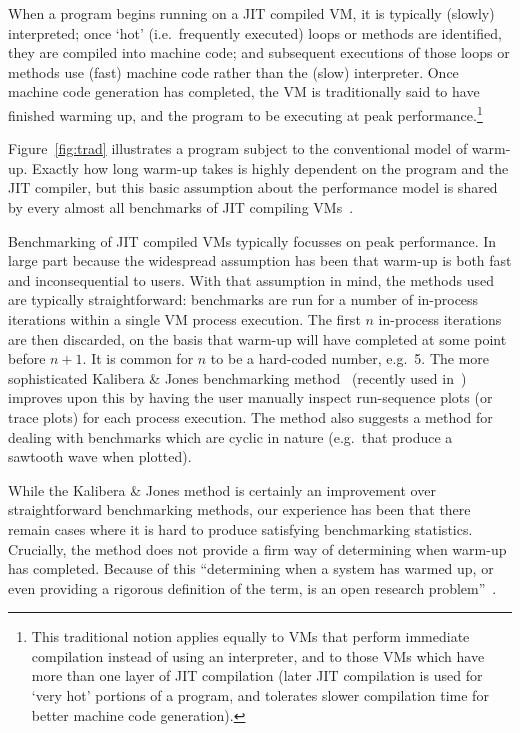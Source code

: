 \documentclass[preprint]{sigplanconf}
\newcommand{\kalibera}{Kalibera \& Jones\xspace}
\begin{document}
When a program begins running on a JIT compiled VM, it is typically (slowly)
interpreted; once `hot' (i.e.~frequently executed) loops or methods are
identified, they are compiled into machine code; and subsequent
executions of those loops or methods use (fast) machine code rather than the
(slow) interpreter. Once machine code generation has completed, the VM is
traditionally said to have finished warming up, and the program to be executing
at peak performance.\footnote{This traditional notion applies equally to VMs
that perform immediate compilation instead of using an interpreter, and to
those VMs which have more than one layer of JIT compilation (later JIT
compilation is used for `very hot' portions of a program, and tolerates slower
compilation time for better machine code generation).}

Figure~\ref{fig:trad} illustrates a
program subject to the conventional model of warm-up. Exactly how long warm-up
takes is highly dependent on
the program and the JIT compiler, but this basic assumption about the
performance model is shared by every almost all benchmarks of JIT compiling
VMs~\cite{kalibera13rigorous}.

Benchmarking of JIT compiled VMs typically focusses on peak
performance. In large part because the widespread assumption has been that
warm-up is both fast and inconsequential to users. With that assumption in mind, the
methods used are typically straightforward: benchmarks are run for a number
of in-process iterations within a single VM process execution.
The first $n$ in-process iterations are then discarded, on the basis that warm-up
will have completed at some point before $n+1$. It is common for
$n$ to be a hard-coded number, e.g.~5. The more sophisticated \kalibera
benchmarking method~\cite{kalibera12quantifying,kalibera13rigorous}
(recently used in~\cite{barrett15approaches,grimmer15dynamically}) improves
upon this by having the user manually inspect run-sequence plots (or trace
plots) for each process execution. The method also suggests a method for
dealing with benchmarks which are cyclic in nature (e.g.~that produce a
sawtooth wave when plotted).

While the \kalibera method is certainly an improvement over
straightforward benchmarking methods,
our experience has been that there remain cases where it is hard to produce
satisfying benchmarking statistics. Crucially, the method does not
provide a firm way of determining when warm-up has completed. Because of this
``determining when a system has warmed up, or even providing a
rigorous definition of the term, is an open research problem''~\cite{seaton15phd}.
\end{document}
